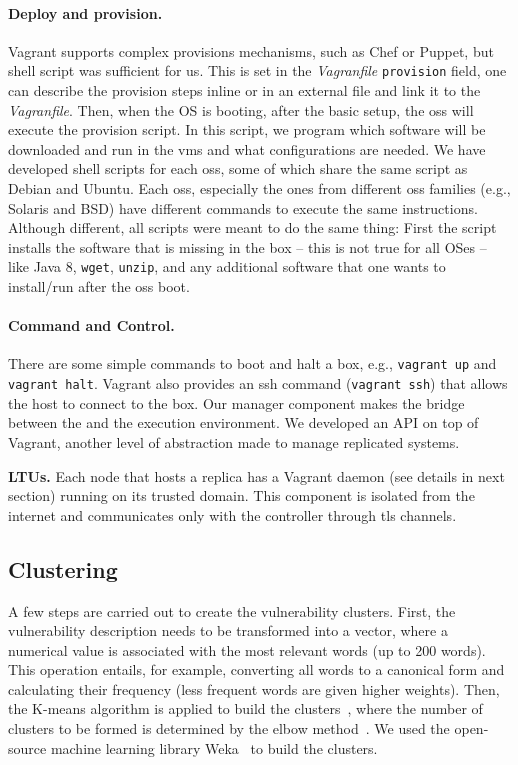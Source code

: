 \paragraph{Deploy and provision.}
Vagrant supports complex provisions mechanisms, such as Chef or Puppet, but shell script was sufficient for us. 
This is set in the \emph{Vagranfile} \texttt{provision} field, one can describe the provision steps inline or in an external file and link it to the \emph{Vagranfile}.
Then, when the OS is booting, after the basic setup, the \glspl{os} will execute the provision script.
In this script, we program which software will be downloaded and run in the \glspl{vm} and what configurations are needed. 
We have developed shell scripts for each \glspl{os}, some of which share the same script as Debian and Ubuntu. 
Each \glspl{os}, especially the ones from different \glspl{os} families (e.g., Solaris and BSD) have different commands to execute the same instructions.
Although different, all scripts were meant to do the same thing:
First the script installs the software that is missing in the box -- this is not true for all OSes -- like Java 8, \texttt{wget}, \texttt{unzip}, and any additional software that one wants to install/run after the \glspl{os} boot.



\paragraph{Command and Control.}
There are some simple commands to boot and halt a box, e.g., \texttt{vagrant up} and \texttt{vagrant halt}. 
Vagrant also provides an ssh command (\texttt{vagrant ssh}) that allows the host to connect to the box. 
Our manager component makes the bridge between the \risk and the execution environment.
We developed an API on top of Vagrant, another level of abstraction made to manage replicated systems.


 \textbf{LTUs.} Each node that hosts a replica has a Vagrant daemon (see details in next section) running on its trusted domain.
This component is isolated from the internet and communicates only with the \system controller through \gls{tls} channels.



\subsection{Clustering}\label{sec:clustering}

A few steps are carried out to create the vulnerability clusters. 
First, the vulnerability description needs to be transformed into a vector, where a numerical value is associated with the most relevant words (up to 200 words). 
This operation entails, for example, converting all words to a canonical form and calculating their frequency (less frequent words are given higher weights).
Then, the K-means algorithm is applied to build the clusters~\cite{Jain:2010}, where the number of clusters to be formed is determined by the elbow method~\cite{Thorndike:1953}. 
We used the open-source machine learning library Weka~\cite{weka} to build the clusters. 


